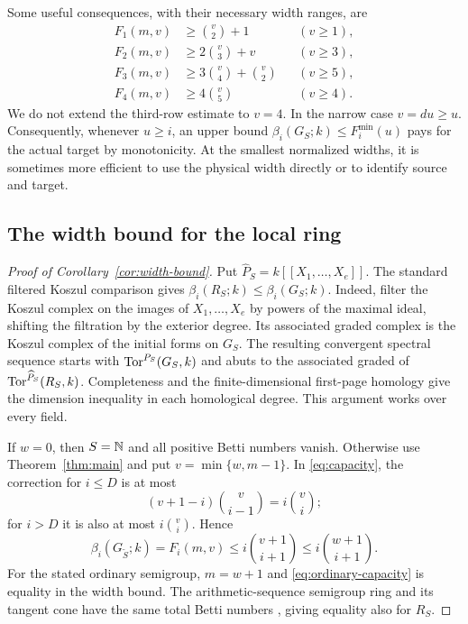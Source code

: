 Some useful consequences, with their necessary width ranges, are
\begin{align}\label{eq:low-capacities}
 F_1(m,v)&\ge\binom v2+1 &&(v\ge1),\nonumber\\
 F_2(m,v)&\ge2\binom v3+v &&(v\ge3),\\
 F_3(m,v)&\ge3\binom v4+\binom v2 &&(v\ge5),\nonumber\\
 F_4(m,v)&\ge4\binom v5 &&(v\ge4).\nonumber
\end{align}
We do not extend the third-row estimate to $v=4$.
In the narrow case $v=du\ge u$. Consequently, whenever $u\ge i$,
an upper bound $\beta_i(G_S;k)\le F_i^{\min}(u)$ pays for the
actual target by monotonicity. At the smallest normalized widths, it is
sometimes more efficient to use the physical width directly or to
identify source and target.

\subsection{The width bound for the local ring}
\begin{proof}[Proof of Corollary~\ref{cor:width-bound}]
Put $\widehat P_S=k[[X_1,\ldots,X_e]]$. The standard filtered
Koszul comparison gives
$\beta_i(R_S;k)\le\beta_i(G_S;k)$. Indeed, filter the Koszul
complex on the images of $X_1,\ldots,X_e$ by powers of the maximal
ideal, shifting the filtration by the exterior degree. Its associated
graded complex is the Koszul complex of the initial forms on $G_S$.
The resulting convergent spectral sequence starts with
$\operatorname{Tor}^{P_S}(G_S,k)$ and abuts to the associated graded of
$\operatorname{Tor}^{\widehat P_S}(R_S,k)$. Completeness and the finite-dimensional
first-page homology give the dimension inequality in each homological
degree. This argument works over every field.

If $w=0$, then $S=\mathbb N$ and all positive Betti numbers vanish.
Otherwise use Theorem~\ref{thm:main} and put
$v=\min\{w,m-1\}$. In \eqref{eq:capacity}, the correction for
$i\le D$ is at most
\[
 (v+1-i)\binom v{i-1}=i\binom vi;
\]
for $i>D$ it is also at most $i\binom vi$. Hence
\[
 \beta_i(G_{\widetilde S};k)=F_i(m,v)
 \le i\binom{v+1}{i+1}\le i\binom{w+1}{i+1}.
\]
For the stated ordinary semigroup, $m=w+1$ and
\eqref{eq:ordinary-capacity} is equality in the width bound.
The arithmetic-sequence semigroup ring and its tangent cone have the
same total Betti numbers \cite{APFormula,APCone}, giving equality also
for $R_S$.
\end{proof}
